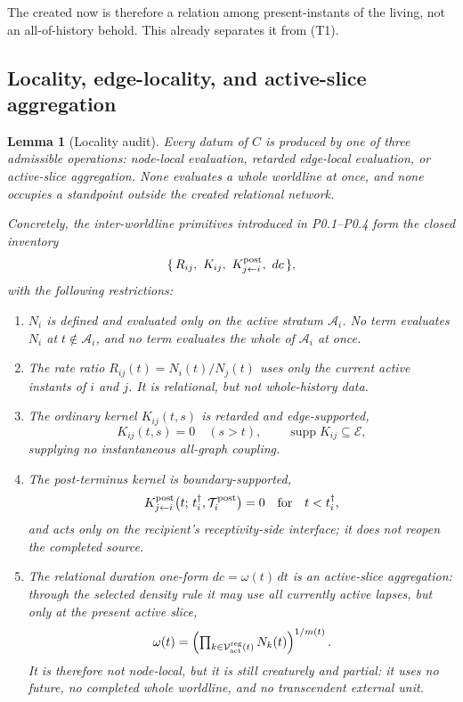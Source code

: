 \documentclass[11pt,a4paper]{article}
\def\mathfrak#1{#1}%
\theoremstyle{definition}
\theoremstyle{plain}
\newtheorem{lemma}[definition]{Lemma}
\theoremstyle{remark}
\begin{document}
\noindent The created now is therefore a relation among present-instants of the living,
not an all-of-history behold. This already separates it from (T1).

\subsection{Locality, edge-locality, and active-slice aggregation}

\begin{lemma}[Locality audit]\label{lem:local}
Every datum of \(C\) is produced by one of three admissible operations: node-local
evaluation, retarded edge-local evaluation, or active-slice aggregation. None evaluates
a whole worldline at once, and none occupies a standpoint outside the created relational
network.

Concretely, the inter-worldline primitives introduced in P0.1--P0.4 form the closed
inventory
\[
\{\,R_{ij},\ K_{ij},\ K^{\rm post}_{j\leftarrow i},\ d\mathfrak c\,\},
\]
with the following restrictions:
\begin{enumerate}[label=\textup{(\roman*)},leftmargin=1.2cm]
\item \(N_i\) is defined and evaluated only on the active stratum \(\mathcal A_i\). No
term evaluates \(N_i\) at \(t\notin\mathcal A_i\), and no term evaluates the whole of
\(\mathcal A_i\) at once.

\item The rate ratio \(R_{ij}(t)=N_i(t)/N_j(t)\) uses only the current active instants of
\(i\) and \(j\). It is relational, but not whole-history data.

\item The ordinary kernel \(K_{ij}(t,s)\) is retarded and edge-supported,
\[
K_{ij}(t,s)=0\quad(s>t),
\qquad
\operatorname{supp}K_{ij}\subseteq\mathcal E,
\]
supplying no instantaneous all-graph coupling.

\item The post-terminus kernel is boundary-supported,
\[
K^{\rm post}_{j\leftarrow i}\bigl(t;\,t_i^\dagger,\mathcal T_i^{\rm post}\bigr)=0
\quad\text{for}\quad t<t_i^\dagger,
\]
and acts only on the recipient's receptivity-side interface; it does not reopen the
completed source.

\item The relational duration one-form \(d\mathfrak c=\omega(t)\,dt\) is an active-slice
aggregation: through the selected density rule it may use all currently active lapses,
but only at the present active slice,
\[
\omega(t)=\left(\textstyle\prod_{k\in\mathcal V_{\rm act}^{\rm reg}(t)}N_k(t)\right)^{1/m(t)}.
\]
It is therefore not node-local, but it is still creaturely and partial: it uses no
future, no completed whole worldline, and no transcendent external unit.
\end{enumerate}
\end{lemma}
\end{document}
